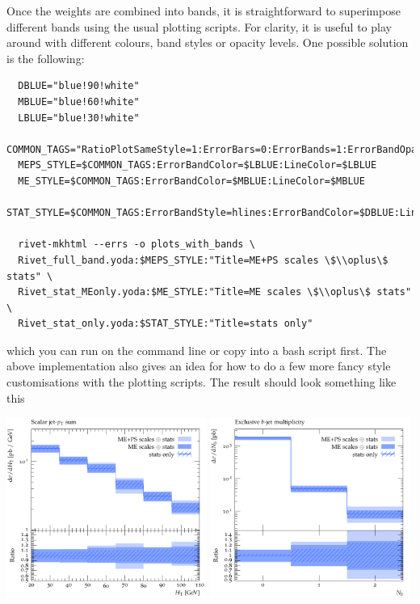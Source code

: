 \documentclass[10pt,fleqn]{scrartcl}
\theoremstyle{exstyle}
\begin{document}
Once the weights are combined into bands, it is straightforward
to superimpose different bands using the usual plotting
scripts. For clarity, it is useful to play around with different
colours, band styles or opacity levels. One possible solution
is the following:
\begin{verbatim}
  DBLUE="blue!90!white"
  MBLUE="blue!60!white"
  LBLUE="blue!30!white"
  COMMON_TAGS="RatioPlotSameStyle=1:ErrorBars=0:ErrorBands=1:ErrorBandOpacity=0.5"
  MEPS_STYLE=$COMMON_TAGS:ErrorBandColor=$LBLUE:LineColor=$LBLUE
  ME_STYLE=$COMMON_TAGS:ErrorBandColor=$MBLUE:LineColor=$MBLUE
  STAT_STYLE=$COMMON_TAGS:ErrorBandStyle=hlines:ErrorBandColor=$DBLUE:LineColor=$DBLUE

  rivet-mkhtml --errs -o plots_with_bands \
  Rivet_full_band.yoda:$MEPS_STYLE:"Title=ME+PS scales \$\\oplus\$ stats" \
  Rivet_stat_MEonly.yoda:$ME_STYLE:"Title=ME scales \$\\oplus\$ stats" \
  Rivet_stat_only.yoda:$STAT_STYLE:"Title=stats only"
\end{verbatim}
which you can run on the command line or copy into a bash script first.
The above implementation also gives an idea for how to do a few more
fancy style customisations with the plotting scripts. 
The result should look something like this

\begin{center}
\includegraphics[width=0.49\textwidth]{figures/HT_bands.pdf}
\includegraphics[width=0.49\textwidth]{figures/bjets_excl_bands.pdf}
\end{center}
\end{document}
